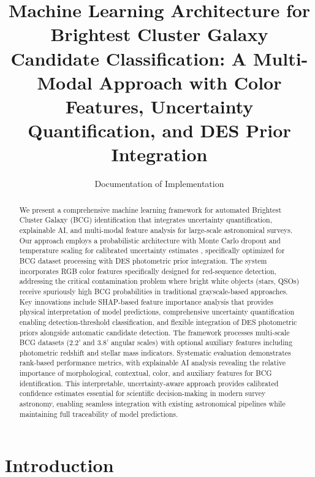 \documentclass[twocolumn,10pt]{aastex631}
\begin{document}
\title{Machine Learning Architecture for Brightest Cluster Galaxy Candidate Classification: A Multi-Modal Approach with Color Features, Uncertainty Quantification, and DES Prior Integration}

\author{Documentation of Implementation}

\begin{abstract}
We present a comprehensive machine learning framework for automated Brightest Cluster Galaxy (BCG) identification that integrates uncertainty quantification, explainable AI, and multi-modal feature analysis for large-scale astronomical surveys. Our approach employs a probabilistic architecture with Monte Carlo dropout and temperature scaling for calibrated uncertainty estimates \citep{Laves2019WellCalibratedMU,Gal2016MCDropout}, specifically optimized for BCG dataset processing with DES photometric prior integration. The system incorporates RGB color features specifically designed for red-sequence detection, addressing the critical contamination problem where bright white objects (stars, QSOs) receive spuriously high BCG probabilities in traditional grayscale-based approaches. Key innovations include SHAP-based feature importance analysis that provides physical interpretation of model predictions, comprehensive uncertainty quantification enabling detection-threshold classification, and flexible integration of DES photometric priors \citep{Rykoff2016DES} alongside automatic candidate detection. The framework processes multi-scale BCG datasets (2.2' and 3.8' angular scales) with optional auxiliary features including photometric redshift and stellar mass indicators. Systematic evaluation demonstrates rank-based performance metrics, with explainable AI analysis revealing the relative importance of morphological, contextual, color, and auxiliary features for BCG identification. This interpretable, uncertainty-aware approach provides calibrated confidence estimates essential for scientific decision-making in modern survey astronomy, enabling seamless integration with existing astronomical pipelines while maintaining full traceability of model predictions.
\end{abstract}


\section{Introduction}
\end{document}
